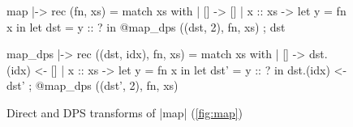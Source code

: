 \begin{figure}[tp]
\begin{minipage}{.40\columnwidth}
\begin{Datalang}
map |-> rec (fn, xs) =
  match xs with
  | [] ->
      []
  | x :: xs ->
      let y = fn x in
      let dst = y :: ? in
      @map_dps ((dst, 2), fn, xs) ;
      dst
\end{Datalang}
\end{minipage}
\hfill
\begin{minipage}{.52\columnwidth}
\begin{Datalang}
map_dps |-> rec ((dst, idx), fn, xs) =
  match xs with
  | [] ->
      dst.(idx) <- []
  | x :: xs ->
      let y = fn x in
      let dst' = y :: ? in
      dst.(idx) <- dst' ;
      @map_dps ((dst', 2), fn, xs)
\end{Datalang}
\end{minipage}
\caption{Direct and DPS transforms of \datalang|map| (\cref{fig:map})}
\label{fig:map_tmc}
\end{figure}